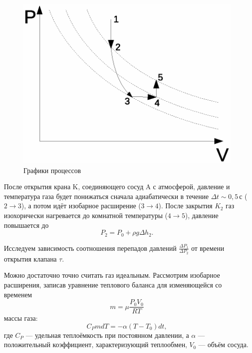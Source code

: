 \documentclass[12pt]{article}
\begin{document}
	\begin{figure}[h!]
	\caption{Графики процессов}
	\label{fig:process}
	\begin{center}
	\includegraphics[scale=1]{process.eps}
	\end{center}
	\end{figure}
	
	После открытия крана K, соединяющего сосуд A с атмосферой, давление и температура газа будет понижаться сначала адиабатически в течение $\Delta t \sim 0{,}5 \,\text{с}$ ($2 \rightarrow 3$), а потом идёт изобарное расширение ($3 \rightarrow 4$). После закрытия $K_2$ газ изохорически нагревается до комнатной температуры ($4 \rightarrow 5$), давление повышается до
	\begin{equation}
	\label{eq:pressure_base_2}
	P_2=P_0+\rho g\Delta h_2.
	\end{equation}
	
	Исследуем зависимость соотношения перепадов давлений $\frac{\Delta P_1}{\Delta P_2}$ от времени открытия клапана $\tau$.
	
	Можно достаточно точно считать газ идеальным. Рассмотрим изобарное расширения, записав уравнение теплового баланса для изменяющейся со временем
	\begin{equation}
	\label{eq:ch_mass}
	m = \mu \frac{P_0 V_0}{RT}
	\end{equation}
	массы газа:
	\begin{equation}
	\label{eq:heat_balance_base}
	C_P m dT = - \alpha \left( T-T_0 \right) dt,
	\end{equation}
	где $C_P$ --- удельная теплоёмкость при постоянном давлении, а $\alpha$ --- положительный коэффициент, характеризующий теплообмен, $V_0$ --- объём сосуда.
	
\end{document}
